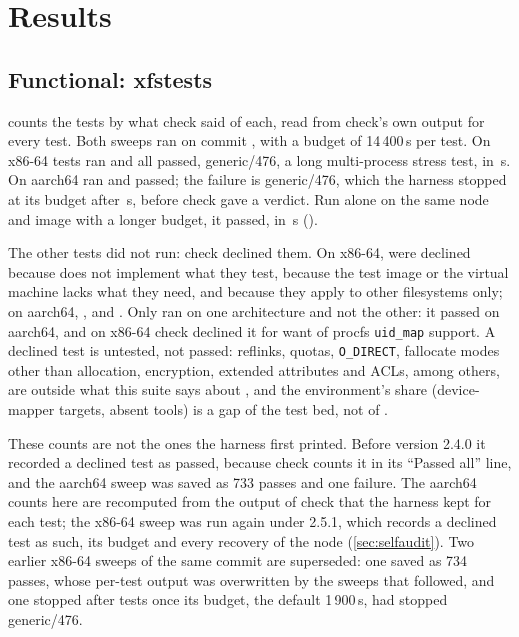 \section{Results}\label{sec:results}

\subsection{Functional: xfstests}\label{sec:xfstests}

 counts the \xfsTotal{} tests by what check said of each,
read from check's own output for every test. Both sweeps ran on commit
\texttt{\commitBeamfs}, with a budget of 14\,400\,s per test. On x86-64
\xfsXRan{} tests ran and all passed, generic/476, a long multi-process
stress test, in \xfsXfullSeconds\,s. On aarch64 \xfsARan{} ran and
\xfsAPass{} passed; the failure is generic/476, which the harness stopped
at its budget after \xfsAfullSeconds\,s, before check gave a verdict. Run
alone on the same node and image with a longer budget, it passed, in
\xfsAsoloSeconds\,s (\texttt{\sweepAsoloName}).

The other tests did not run: check declined them. On x86-64,
\xfsXNrFeature{} were declined because \bfs does not implement what they
test, \xfsXNrEnv{} because the test image or the virtual machine lacks
what they need, and \xfsXNrScope{} because they apply to other
filesystems only; on aarch64, \xfsANrFeature, \xfsANrEnv{} and
\xfsANrScope. Only \xfsNotrunDifferList{} ran on one architecture and not the
other: it passed on aarch64, and on x86-64 check declined it for want
of procfs \texttt{uid\_map} support. A declined test is untested, not passed: reflinks,
quotas, \texttt{O\_DIRECT}, fallocate modes other than allocation,
encryption, extended attributes and ACLs, among others, are outside what
this suite says about \bfs, and the environment's share (device-mapper
targets, absent tools) is a gap of the test bed, not of \bfs.

These counts are not the ones the harness first printed. Before version
2.4.0 it recorded a declined test as passed, because check counts it in
its ``Passed all'' line, and the aarch64 sweep was saved as 733 passes
and one failure. The aarch64 counts here are recomputed from the output
of check that the harness kept for each test; the x86-64 sweep was run
again under 2.5.1, which records a declined test as such, its budget and
every recovery of the node (\cref{sec:selfaudit}). Two earlier x86-64
sweeps of the same commit are superseded: one saved as 734 passes, whose
per-test output was overwritten by the sweeps that followed, and one
stopped after \xfsSupDone{} tests once its budget, the default
1\,900\,s, had stopped generic/476.

